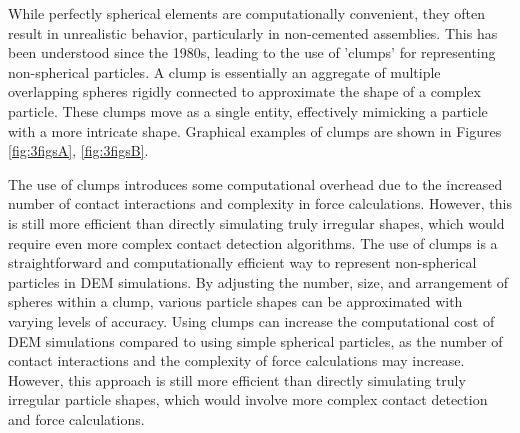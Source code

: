 While perfectly spherical elements are computationally convenient, they often result in unrealistic behavior, particularly in non-cemented assemblies. This has been understood since the 1980s, leading to the use of 'clumps' for representing non-spherical particles. A clump is essentially an aggregate of multiple overlapping spheres rigidly connected to approximate the shape of a complex particle. These clumps move as a single entity, effectively mimicking a particle with a more intricate shape. Graphical examples of clumps are shown in Figures \ref{fig:3figsA}, \ref{fig:3figsB}.

The use of clumps introduces some computational overhead due to the increased number of contact interactions and complexity in force calculations. However, this is still more efficient than directly simulating truly irregular shapes, which would require even more complex contact detection algorithms. The use of clumps is a straightforward and computationally efficient way to represent non-spherical particles in DEM simulations. By adjusting the number, size, and arrangement of spheres within a clump, various particle shapes can be approximated with varying levels of accuracy. Using clumps can increase the computational cost of DEM simulations compared to using simple spherical particles, as the number of contact interactions and the complexity of force calculations may increase. However, this approach is still more efficient than directly simulating truly irregular particle shapes, which would involve more complex contact detection and force calculations.

